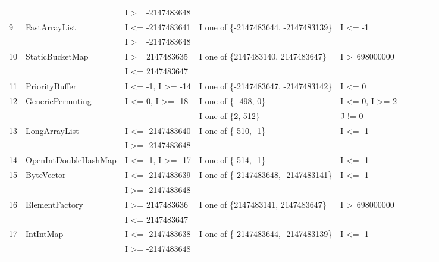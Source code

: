\documentclass[runningheads,a4paper]{llncs}
\begin{document}
\begin{table}[h]
{{\begin{tabular}{|l|l|l|l|l|l|l|l|l|}
	&                                             & I \textgreater= -2147483648				& 										&  			   						\\
9	& FastArrayList				& I \textless= -2147483641 					& I one of \{-2147483644, -2147483139\}	& I \textless= -1						\\ 
	&                                             & I \textgreater= -2147483648				& 										&  			   						\\	
10	& StaticBucketMap			& I \textgreater= 2147483635				& I one of \{2147483140, 2147483647\} 	& I \textgreater~698000000			\\ 
	&                                             & I \textless= 2147483647					& 										&  			   						\\	
11	& PriorityBuffer				& I \textless= -1, I \textgreater= -14			& I one of \{-2147483647, -2147483142\}	& I \textless= 0						\\ 
12	& GenericPermuting			& I \textless= 0, I \textgreater= -18			& I one of \{ -498, 0\}					& I \textless= 0, I \textgreater= 2		\\ 
	&                                             & 											& I one of \{2, 512\}						& J != 0			   					\\
13	& LongArrayList				& I \textless= -2147483640					& I one of \{-510, -1\}					& I \textless= -1						\\ 
	&                                             & I \textgreater= -2147483648				& 										&  			   						\\
14	& OpenIntDoubleHashMap	& I \textless= -1, I \textgreater= -17			& I one of \{-514, -1\}    					& I \textless= -1						\\ 
15	& ByteVector					& I \textless= -2147483639					& I one of \{-2147483648, -2147483141\}	& I \textless= -1						\\ 	
	&                                             & I \textgreater= -2147483648				& 										&  			   						\\	
16	& ElementFactory				& I \textgreater= 2147483636				& I one of \{2147483141, 2147483647\}    & I \textgreater~698000000			\\ 
	&                                             & I \textless= 2147483647					& 										&  			   						\\	
17	& IntIntMap					& I \textless= -2147483638					& I one of \{-2147483644, -2147483139\}	& I \textless= -1						\\ 
	&                                             & I \textgreater= -2147483648				& 										&  			   						\\	

\end{tabular}}}
\end{table}
\end{document}
